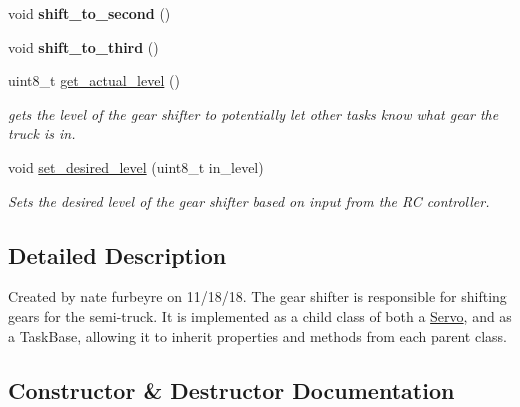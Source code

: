 \begin{DoxyCompactItemize}
\item 
void {\bfseries shift\+\_\+to\+\_\+second} ()\hypertarget{classgear__shifter_a58810c4ba96476ad184377fc26833e8b}{}\label{classgear__shifter_a58810c4ba96476ad184377fc26833e8b}

\item 
void {\bfseries shift\+\_\+to\+\_\+third} ()\hypertarget{classgear__shifter_a1d450a2bb898853995968bc7335fd166}{}\label{classgear__shifter_a1d450a2bb898853995968bc7335fd166}

\item 
uint8\+\_\+t \hyperlink{classgear__shifter_a0956653ddfbdc4d93872a5efa9cf5ee6}{get\+\_\+actual\+\_\+level} ()
\begin{DoxyCompactList}\small\item\em gets the level of the gear shifter to potentially let other tasks know what gear the truck is in. \end{DoxyCompactList}\item 
void \hyperlink{classgear__shifter_abb8fdfb5b94ea42779a75184c2cb2b37}{set\+\_\+desired\+\_\+level} (uint8\+\_\+t in\+\_\+level)
\begin{DoxyCompactList}\small\item\em Sets the desired level of the gear shifter based on input from the RC controller. \end{DoxyCompactList}\end{DoxyCompactItemize}


\subsection{Detailed Description}
Created by nate furbeyre on 11/18/18. The gear shifter is responsible for shifting gears for the semi-\/truck. It is implemented as a child class of both a \hyperlink{classServo}{Servo}, and as a Task\+Base, allowing it to inherit properties and methods from each parent class. 

\subsection{Constructor \& Destructor Documentation}
